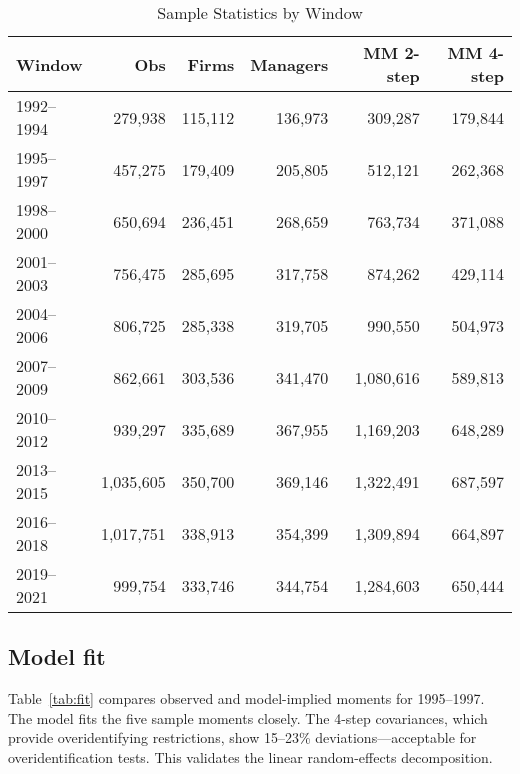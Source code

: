 \documentclass[9pt,twocolumn,twoside]{pnas-new}
\begin{document}
\begin{table}[t]
\centering
\caption{Sample Statistics by Window}
\label{tab:sample-stats}
\begin{tabular}{lrrrrr}
\toprule
Window & Obs & Firms & Managers & MM 2-step & MM 4-step \\
\midrule
1992--1994 & 279,938 & 115,112 & 136,973 & 309,287 & 179,844 \\
1995--1997 & 457,275 & 179,409 & 205,805 & 512,121 & 262,368 \\
1998--2000 & 650,694 & 236,451 & 268,659 & 763,734 & 371,088 \\
2001--2003 & 756,475 & 285,695 & 317,758 & 874,262 & 429,114 \\
2004--2006 & 806,725 & 285,338 & 319,705 & 990,550 & 504,973 \\
2007--2009 & 862,661 & 303,536 & 341,470 & 1,080,616 & 589,813 \\
2010--2012 & 939,297 & 335,689 & 367,955 & 1,169,203 & 648,289 \\
2013--2015 & 1,035,605 & 350,700 & 369,146 & 1,322,491 & 687,597 \\
2016--2018 & 1,017,751 & 338,913 & 354,399 & 1,309,894 & 664,897 \\
2019--2021 & 999,754 & 333,746 & 344,754 & 1,284,603 & 650,444 \\
\bottomrule
\end{tabular}

\end{table}

\subsection*{Model fit}
Table~\ref{tab:fit} compares observed and model-implied moments for 1995--1997. The model fits the five sample moments closely. The 4-step covariances, which provide overidentifying restrictions, show 15--23\% deviations---acceptable for overidentification tests. This validates the linear random-effects decomposition.
\end{document}
